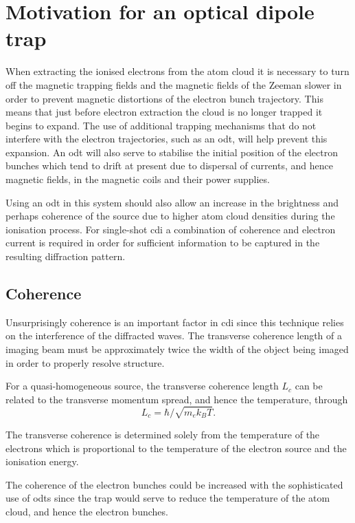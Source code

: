 \chapter{Motivation for an optical dipole trap}

When extracting the ionised electrons from the atom cloud it is necessary to turn off the magnetic trapping fields and the magnetic fields of the Zeeman slower in order to prevent magnetic distortions of the electron bunch trajectory. This means that just before electron extraction the cloud is no longer trapped it begins to expand. The use of additional trapping mechanisms that do not interfere with the electron trajectories, such as an \gls{odt}, will help prevent this expansion. An \gls{odt} will also serve to stabilise the initial position of the electron bunches which tend to drift at present due to dispersal of currents, and hence magnetic fields, in the magnetic coils and their power supplies.

Using an \gls{odt} in this system should also allow an increase in the brightness and perhaps coherence of the source due to higher atom cloud densities during the ionisation process. For single-shot \gls{cdi} a combination of coherence and electron current is required in order for sufficient information to be captured in the resulting diffraction pattern.

\section{Coherence}
Unsurprisingly coherence is an important factor in \gls{cdi} since this technique relies on the interference of the diffracted waves. The transverse coherence length of a imaging beam must be approximately twice the width of the object being imaged\cite{spence_coherence_2004} in order to properly resolve structure.

For a quasi-homogeneous source\cite{nugent_coherent_2009}, the transverse coherence length $L_c$ can be related to the transverse momentum spread, and hence the temperature, through\cite{van_oudheusden_electron_2007}
\begin{equation}
L_c = \hbar/\sqrt{m_e k_B T}.
\end{equation}

The transverse coherence is determined solely from the temperature of the electrons which is proportional to the temperature of the electron source and the ionisation energy.

The coherence of the electron bunches could be increased with the sophisticated use of \glspl{odt} since the trap would serve to reduce the temperature of the atom cloud, and hence the electron bunches.

